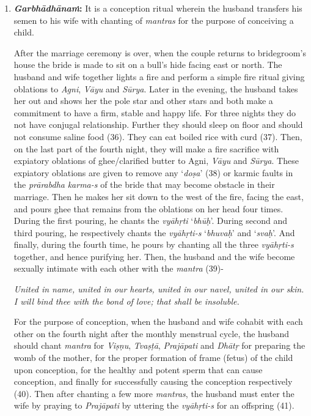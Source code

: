 \begin{enumerate}
\itemsep=0pt
\item
  \textbf{\emph{Garbhādhānaṁ}:} It is a conception ritual wherein the husband transfers his semen to his wife with chanting of \emph{mantras} for the purpose of conceiving a child.

  After the marriage ceremony is over, when the couple returns to bridegroom's house the bride is made to sit on a bull's hide facing east or north. The husband and wife together lights a fire and perform a simple fire ritual giving oblations to \emph{Agni}, \emph{Vāyu} and \emph{Sūrya}. Later in the evening, the husband takes her out and shows her the pole star and other stars and both make a commitment to have a firm, stable and happy life. For three nights they do not have conjugal relationship. Further they should sleep on floor and should not consume saline food (36). They can eat boiled rice with curd (37). Then, on the last part of the fourth night, they will make a fire sacrifice with expiatory oblations of ghee/clarified butter to Agni, \emph{Vāyu} and \emph{Sūrya}. These expiatory oblations are given to remove any `\emph{doṣa}' (38) or karmic faults in the \emph{prārabdha} \emph{karma-s} of the bride that may become obstacle in their marriage. Then he makes her sit down to the west of the fire, facing the east, and pours ghee that remains from the oblations on her head four times. During the first pouring, he chants the \emph{vyāhṛti} `\emph{bhūḥ}'. During second and third pouring, he respectively chants the \emph{vyāhṛti-s} `\emph{bhuvaḥ}' and `\emph{svaḥ}'. And finally, during the fourth time, he pours by chanting all the three \emph{vyāhṛti-s} together, and hence purifying her. Then, the husband and the wife become sexually intimate with each other with the \emph{mantra} (39)-

  \emph{} \emph{}

  \emph{United in name, united in our hearts, united in our navel, united in our skin. I will bind thee with the bond of love; that shall be insoluble. }

  For the purpose of conception, when the husband and wife cohabit with each other on the fourth night after the monthly menstrual cycle, the husband should chant \emph{mantra} for \emph{Viṣṇu}, \emph{Tvaṣṭā}, \emph{Prajāpati} and \emph{Dhātṛ} for preparing the womb of the mother, for the proper formation of frame (fetus) of the child upon conception, for the healthy and potent sperm that can cause conception, and finally for successfully causing the conception respectively (40). Then after chanting a few more \emph{mantras}, the husband must enter the wife by praying to \emph{Prajāpati} by uttering the \emph{vyāhṛti-s} for an offspring (41).


\end{enumerate}
